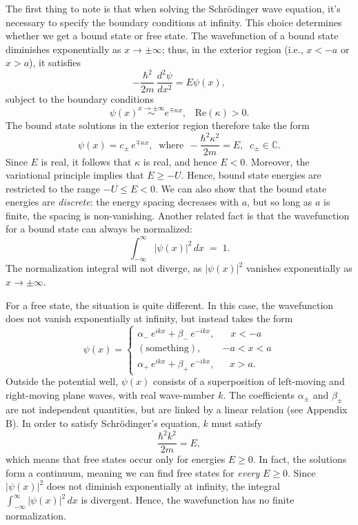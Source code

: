 \documentclass[pra,12pt]{revtex4}
\begin{document}
The first thing to note is that when solving the Schr\"odinger wave
equation, it's necessary to specify the boundary conditions at
infinity.  This choice determines whether we get a bound state or free
state.  The wavefunction of a bound state diminishes exponentially as
$x \rightarrow \pm\infty$; thus, in the exterior region (i.e., $x <
-a$ or $x > a$), it satisfies
$$-\frac{\hbar^2}{2m}\,\frac{d^2\psi}{dx^2} = E \psi(x),$$
subject to the boundary conditions
$$\psi(x) \overset{x\rightarrow\pm\infty}{\sim} e^{\mp\kappa x}, \;\;\;\mathrm{Re}(\kappa) > 0.$$
The bound state solutions in the exterior region therefore take the
form
$$\psi(x) = c_\pm\, e^{\mp\kappa x}, \;\;\mathrm{where}\;\, -\frac{\hbar^2\kappa^2}{2m} = E, \;\; c_\pm \in \mathbb{C}.$$
Since $E$ is real, it follows that $\kappa$ is real, and hence $E <
0$.  Moreover, the variational principle implies that $E \ge -U$.
Hence, bound state energies are restricted to the range $-U \le E <
0$.  We can also show that the bound state energies are
\textit{discrete}: the energy spacing decreases with $a$, but so long
as $a$ is finite, the spacing is non-vanishing.  Another related
fact is that the wavefunction for a bound state can always be
normalized:
$$\int_{-\infty}^\infty |\psi(x)|^2\, dx\; =\; 1.$$
The normalization integral will not diverge, as $|\psi(x)|^2$ vanishes
exponentially as $x \rightarrow \pm \infty$.

For a free state, the situation is quite different.  In this case, the
wavefunction does not vanish exponentially at infinity, but instead
takes the form
$$\psi(x) = \begin{cases} \alpha_-\, e^{ik x} + \beta_-\, e^{-ik x}, & \;\;\;x < -a\\ (\mathrm{something}) , & -a < x < a\\ \alpha_+\, e^{ik x} + \beta_+\, e^{-ik x} , & \;\;\,x > a.\end{cases}$$
Outside the potential well, $\psi(x)$ consists of a superposition of
left-moving and right-moving plane waves, with real wave-number $k$.  The
coefficients $\alpha_\pm$ and $\beta_\pm$ are not independent
quantities, but are linked by a linear relation (see Appendix B).  In
order to satisfy Schr\"odinger's equation, $k$ must satisfy
$$\frac{\hbar^2k^2}{2m} = E,$$
which means that free states occur only for energies $E \ge 0$.  In
fact, the solutions form a continuum, meaning we can find free states
for \textit{every} $E \ge 0$.  Since $|\psi(x)|^2$ does not diminish
exponentially at infinity, the integral $\int_{-\infty}^\infty
|\psi(x)|^2\, dx$ is divergent.  Hence, the wavefunction has no finite
normalization.
\end{document}

